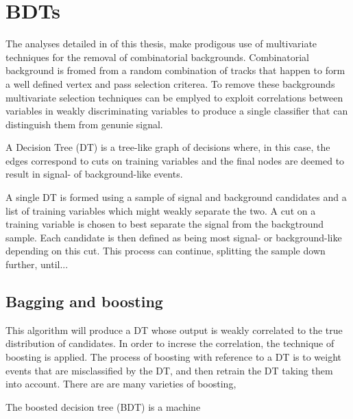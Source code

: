 \chapter{BDTs}

The analyses detailed in  of this thesis, make prodigous use of multivariate
techniques for the removal of combinatorial backgrounds.
Combinatorial background is fromed from a random combination of tracks that happen to form a well
defined vertex and pass selection criterea.
To remove these backgrounds multivariate selection techniques can be emplyed to exploit
correlations between variables in weakly discriminating variables to produce a single classifier
that can distinguish them from genunie signal.

A Decision Tree (DT) is a tree-like graph of decisions where, in this case, the edges correspond to
cuts on training variables and the final nodes are deemed to result in signal- of
background-like events.

A single DT is formed using a sample of signal and background candidates and a list of training
variables which might weakly separate the two.
A cut on a training variable is chosen to best separate the signal from the backgtround sample.
Each candidate is then defined as being most signal- or background-like depending on this cut.
This process can continue, splitting the sample down further, until...

\section{Bagging and boosting}
This algorithm will produce a DT whose output is weakly correlated to the true distribution of
candidates.
In order to increse the correlation, the technique of boosting is applied.
The process of boosting with reference to a DT is to weight events that are misclassified by the
DT, and then retrain the DT taking them into account.
There are are many varieties of boosting,






The boosted decision tree (BDT) is a machine
\cite{AdaBoost}
